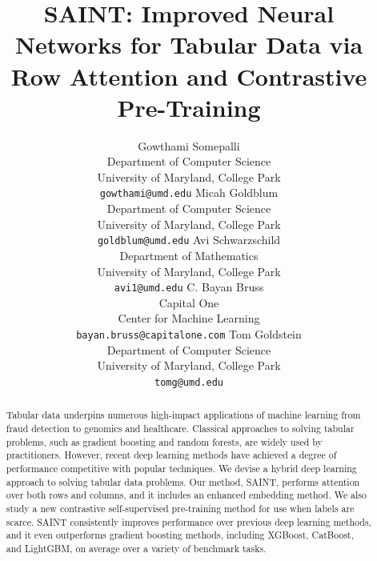 \documentclass{article}
\title{SAINT: Improved Neural Networks for Tabular Data via Row Attention and Contrastive Pre-Training}
\author{%
   Gowthami Somepalli \\
   Department of Computer Science \\
   University of Maryland, College Park \\
   \texttt{gowthami@umd.edu}
   \And
   Micah Goldblum \\
   Department of Computer Science \\
   University of Maryland, College Park \\
   \texttt{goldblum@umd.edu}
   \And
   Avi Schwarzschild \\
   Department of Mathematics \\
   University of Maryland, College Park \\
   \texttt{avi1@umd.edu}
   \And
   C. Bayan Bruss \\
   Capital One \\
   Center for Machine Learning\\
   \texttt{bayan.bruss@capitalone.com}
    \And
   Tom Goldstein \\
   Department of Computer Science \\
   University of Maryland, College Park \\
   \texttt{tomg@umd.edu}
}
\begin{document}
\maketitle

\begin{abstract}
Tabular data underpins numerous high-impact applications of machine learning from fraud detection to genomics and healthcare.  Classical approaches to solving tabular problems, such as gradient boosting and random forests, are widely used by practitioners.  However, recent deep learning methods have achieved a degree of performance competitive with popular techniques.  We devise a hybrid deep learning approach to solving tabular data problems.  Our method, SAINT, performs attention over both rows and columns, and it includes an enhanced embedding method.  We also study a new contrastive self-supervised pre-training method for use when labels are scarce.  SAINT consistently improves performance over previous deep learning methods, and it even outperforms gradient boosting methods, including XGBoost, CatBoost, and LightGBM, on average over a variety of benchmark tasks.
\end{abstract}
\end{document}
